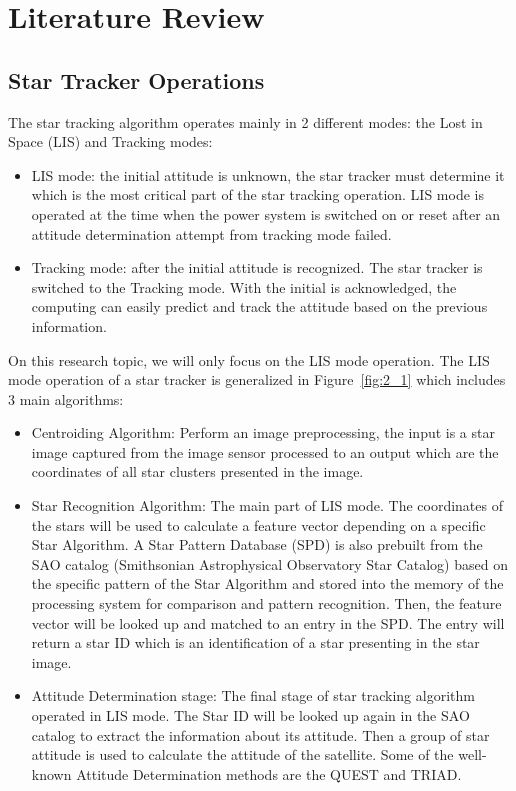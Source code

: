 
\chapter{Literature Review}
\label{chap:lit_review}

\section{Star Tracker Operations}

The star tracking algorithm operates mainly in 2 different modes: the Lost in Space (LIS) and Tracking modes:
\begin{itemize}
	\item LIS mode: the initial attitude is unknown, the star tracker must determine it which is the most critical part of the star tracking operation. LIS mode is operated at the time when the power system is switched on or reset after an attitude determination attempt from tracking mode failed\cite{edselc.2-52.0-8487677997120120101}.
	\item Tracking mode: after the initial attitude is recognized. The star tracker is switched to the Tracking mode. With the initial is acknowledged, the computing can easily predict and track the attitude based on the previous information.
\end{itemize}

\noindent On this research topic, we will only focus on the LIS mode operation. The LIS mode operation of a star tracker is generalized in Figure~\ref{fig:2_1} which includes 3 main algorithms:
\begin{itemize}
	\item Centroiding Algorithm: Perform an image preprocessing, the input is a star image captured from the image sensor processed to an output which are the coordinates of all star clusters presented in the image.
	\item Star Recognition Algorithm: The main part of LIS mode. The coordinates of the stars will be used to calculate a feature vector depending on a specific Star Algorithm. A Star Pattern Database (SPD) is also prebuilt from the SAO catalog (Smithsonian Astrophysical Observatory Star Catalog) based on the specific pattern of the Star Algorithm and stored into the memory of the processing system for comparison and pattern recognition\cite{edseee.655799920130101}. Then, the feature vector will be looked up and matched to an entry in the SPD. The entry will return a star ID which is an identification of a star presenting in the star image.
	\item Attitude Determination stage: The final stage of star tracking algorithm operated in LIS mode. The Star ID will be looked up again in the SAO catalog to extract the information about its attitude. Then a group of star attitude is used to calculate the attitude of the satellite. Some of the well-known Attitude Determination methods are the QUEST and TRIAD.
\end{itemize}

